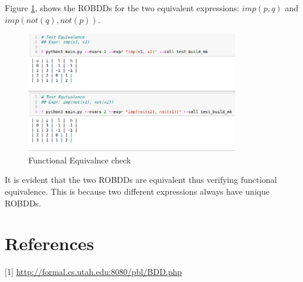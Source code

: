 \documentclass[a4paper, titlepage, 12pt]{article}
\numberwithin{equation}{section}
\begin{document}
            Figure \ref{fig:eq_check}, shows the ROBDDs for the two equivalent expressions: $imp(p, q)$ and $imp(not(q), not(p))$.

            \begin{figure}[htp]
                \centering
                \includegraphics[height=200px, width=350px]{img/eq_check.png}
                \caption{Functional Equivalnce check}
                \label{fig:eq_check}
            \end{figure}

            It is evident that the two ROBDDs are equivalent thus verifying functional equivalence.
            This is because two different expressions always have unique ROBDDs.
            

                        
            
    \section{References}

            [1]  \href{http://formal.cs.utah.edu:8080/pbl/BDD.php}{http://formal.cs.utah.edu:8080/pbl/BDD.php}
\end{document}
